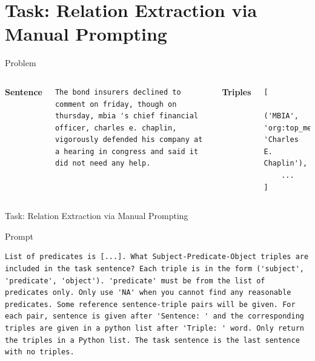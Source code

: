 \documentclass[aspectratio=169,xcolor=dvipsnames]{beamer}
\begin{document}
\section{Task: Relation Extraction via Manual Prompting}

\begin{frame}[fragile]{Problem}
    \begin{columns}[c]
        \textbf{Sentence} \\
        \begin{verbatim}
The bond insurers declined to comment on friday, though on thursday, mbia 's chief financial officer, charles e. chaplin, vigorously defended his company at a hearing in congress and said it did not need any help.
        \end{verbatim} 
        \textbf{Triples}\\
        \begin{verbatim}
[
    ('MBIA', 'org:top_members/employees', 'Charles E. Chaplin'),
    ...
]            
        \end{verbatim}
    \end{columns}
\end{frame}

\begin{frame}{Task: Relation Extraction via Manual Prompting}
\begin{figure}[H]
\centering
{}
\label{fig:llm_graph}
\end{figure}
\end{frame}

\begin{frame}[fragile]{Prompt}
\begin{verbatim}
List of predicates is [...]. What Subject-Predicate-Object triples are included in the task sentence? Each triple is in the form ('subject', 'predicate', 'object'). 'predicate' must be from the list of predicates only. Only use 'NA' when you cannot find any reasonable predicates. Some reference sentence-triple pairs will be given. For each pair, sentence is given after 'Sentence: ' and the corresponding triples are given in a python list after 'Triple: ' word. Only return the triples in a Python list. The task sentence is the last sentence with no triples.
\end{verbatim}
\end{frame}
\end{document}
